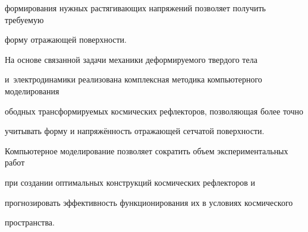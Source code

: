формирования нужных растягивающих напряжений позволяет получить требуемую 

форму отражающей поверхности.



\smallskip




На основе связанной задачи механики деформируемого твердого тела 

и~электродинамики реализована комплексная методика компьютерного моделирования 

ободных трансформируемых космических рефлекторов, позволяющая более точно 

учитывать форму и напряжённость отражающей сетчатой поверхности. 

Компьютерное моделирование позволяет сократить объем экспериментальных работ 

при создании оптимальных конструкций космических рефлекторов и 

прогнозировать эффективность функционирования их в условиях космического 

пространства. 





\renewcommand{\baselinestretch}{.9}




